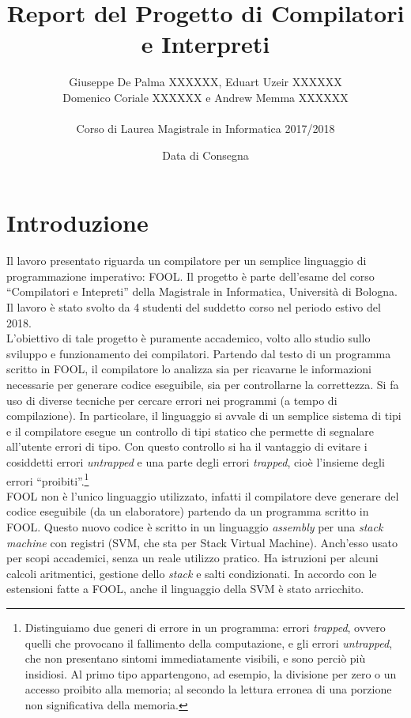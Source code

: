\documentclass{scrreprt}
\title{Report del Progetto di Compilatori e Interpreti}
\date{Data di Consegna}
\author{Giuseppe De Palma XXXXXX, Eduart Uzeir XXXXXX\\ Domenico Coriale XXXXXX e Andrew Memma XXXXXX\\
\\Corso di Laurea Magistrale in Informatica 2017/2018}
\begin{document}
\maketitle

\tableofcontents

\chapter{Introduzione}
Il lavoro presentato riguarda un compilatore per un semplice linguaggio di programmazione imperativo: FOOL. Il progetto è parte dell'esame del corso ``Compilatori e Intepreti'' della Magistrale in Informatica, Università di Bologna. Il lavoro è stato svolto da 4 studenti del suddetto corso nel periodo estivo del 2018.\\

L'obiettivo di tale progetto è puramente accademico, volto allo studio sullo sviluppo e funzionamento dei compilatori. Partendo dal testo di un programma scritto in FOOL, il compilatore lo analizza sia per ricavarne le informazioni necessarie per generare codice eseguibile, sia per controllarne la correttezza. Si fa uso di diverse tecniche per cercare errori nei programmi (a tempo di compilazione). In particolare, il linguaggio si avvale di un semplice sistema di tipi e il compilatore esegue un controllo di tipi statico che permette di segnalare all'utente errori di tipo. Con questo controllo si ha il vantaggio di evitare i cosiddetti errori \textit{untrapped} e una parte degli errori \textit{trapped}, cioè l'insieme degli errori ``proibiti''.\footnote{Distinguiamo due generi di errore in un programma: errori \textit{trapped}, ovvero quelli che provocano il fallimento della computazione, e gli errori	\textit{untrapped}, che non	presentano sintomi immediatamente visibili, e sono perciò più insidiosi. Al primo tipo appartengono, ad esempio, la divisione per zero o un accesso proibito alla memoria; al secondo la lettura erronea di una porzione non significativa della memoria.}\\

FOOL non è l'unico linguaggio utilizzato, infatti il compilatore deve generare del codice eseguibile (da un elaboratore) partendo da un programma scritto in FOOL. Questo nuovo codice è scritto in un linguaggio \textit{assembly} per una \textit{stack machine} con registri (SVM, che sta per Stack Virtual Machine). Anch'esso usato per scopi accademici, senza un reale utilizzo pratico. Ha istruzioni per alcuni calcoli aritmentici, gestione dello \textit{stack} e salti condizionati. In accordo con le estensioni fatte a FOOL, anche il linguaggio della SVM è stato arricchito.
\end{document}
